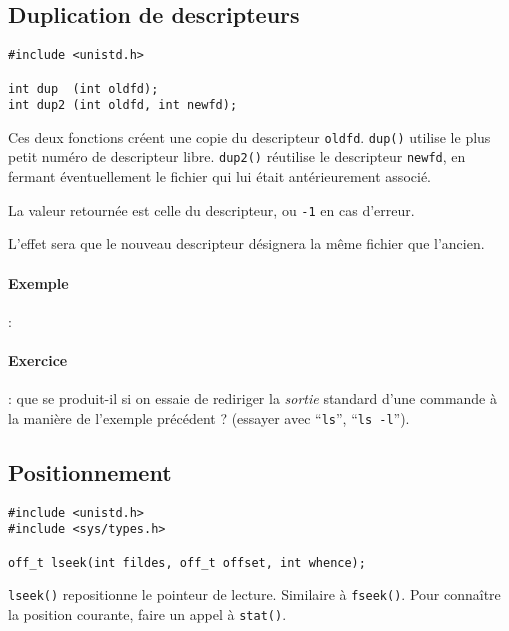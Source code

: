 \subsection{Duplication de descripteurs}

\extrait
\begin{lstlisting}
#include <unistd.h>

int dup  (int oldfd);
int dup2 (int oldfd, int newfd);
\end{lstlisting}


Ces deux fonctions créent une copie du descripteur \texttt{oldfd}.
\texttt{dup()} utilise le plus petit numéro de descripteur libre.
\texttt{dup2()} réutilise le descripteur \texttt{newfd}, en fermant
éventuellement le fichier qui lui était antérieurement associé.

La valeur retournée est celle du descripteur, ou \texttt{-1} en cas d'erreur. 

L'effet sera que le nouveau descripteur désignera la même
fichier que l'ancien.

\paragraph*{Exemple} :

\source



\paragraph*{Exercice} : que se produit-il si on essaie de rediriger la 
\emph{sortie} standard d'une commande à la manière de l'exemple précédent ?
(essayer avec ``\texttt{ls}'', ``\texttt{ls -l}'').


\subsection{Positionnement}

\extrait
\begin{lstlisting}
#include <unistd.h>
#include <sys/types.h>

off_t lseek(int fildes, off_t offset, int whence);
\end{lstlisting}


\texttt{lseek()} repositionne le pointeur de lecture. Similaire à
\texttt{fseek()}. Pour connaître la position courante, faire un appel
à \texttt{stat()}. 

